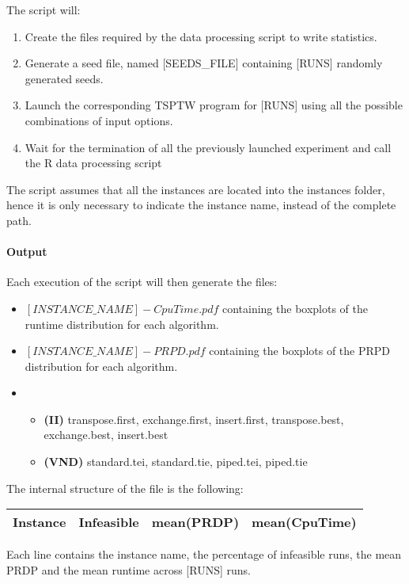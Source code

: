 \documentclass{article}
\begin{document}
The script will:
\begin{enumerate}
  \item Create the files required by the data processing script to write statistics.
  \item Generate a seed file, named [SEEDS\_FILE] containing [RUNS] randomly generated seeds.
  \item Launch the corresponding TSPTW program for [RUNS]  using all the possible combinations of input options.
  \item Wait for the termination of all the previously launched experiment and call the R data processing script
\end{enumerate}

The script assumes that all the instances are located into the instances folder, hence it is only necessary to indicate the instance name, instead of the complete path.

\paragraph{Output}

Each execution of the script will then generate the files:
\begin{itemize}
  \item $[INSTANCE\_NAME]-CpuTime.pdf$ containing the boxplots of the runtime distribution for each algorithm.
  \item $[INSTANCE\_NAME]-PRPD.pdf$ containing the boxplots of the PRPD distribution for each algorithm.
  \item 
        \begin{itemize}
          \item \textbf{(II)} transpose.first, exchange.first, insert.first, transpose.best, exchange.best, insert.best 
          \item \textbf{(VND)} standard.tei, standard.tie, piped.tei, piped.tie
        \end{itemize}
\end{itemize}

The internal structure of the file is the following:

 
\begin{tabular}{|c|c|c|c|}
\hline
\textbf{Instance}	&	\textbf{Infeasible} & \textbf{mean(PRDP)} &	\textbf{mean(CpuTime)} \\ \hline
\end{tabular}

Each line contains the instance name, the percentage of infeasible runs, the mean PRDP and the mean runtime across [RUNS] runs.
\end{document}
